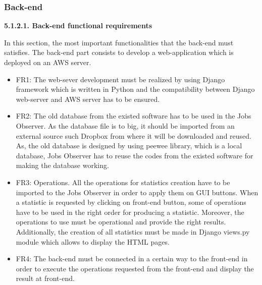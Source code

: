 \documentclass[conference,compsoc]{IEEEtran}
\begin{document}
\subsubsection{Back-end}

\noindent
\newline\newline
\textbf{5.1.2.1. Back-end functional requirements}
\newline

In this section, the most important functionalities that the back-end must satisfies. The back-end part consists to develop a web-application which is deployed on an AWS server. 
\newline

\begin{itemize}
	\item FR1: The web-sever development must be realized by using Django framework which is written in Python and the compatibility between Django web-server and AWS server has to be ensured. 
\newline

\item FR2: The old database from the existed software has to be used in the Jobs Observer. As the database file is to big, it should be imported from an external source such Dropbox from where it will be downloaded and reused. As, the old database is designed by using peewee library, which is a local database, Jobs Observer has to reuse the codes from the existed software for making the database working. 
\newline

\item FR3: Operations. All the operations for statistics creation have to be imported to the Jobs Observer in order to apply them on GUI buttons. When a statistic is requested by clicking on front-end button, some of operations have to be used in the right order for producing a statistic. Moreover, the operations to use must be operational and provide the right results. Additionally, the creation of all statistics must be made in Django views.py module which allows to display the HTML pages. 
\newline

\item FR4: The back-end must be connected in a certain way to the front-end in order to execute the operations requested from the front-end and display the result at front-end. 
\end{itemize}
\end{document}
